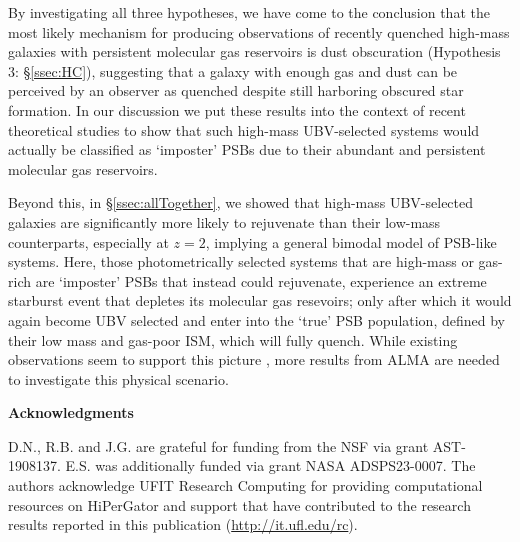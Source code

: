 \documentclass[twocolumn, linenumbers]{aastex631}
\begin{document}
\begin{itemize}[nosep]
\end{itemize}
\vspace*{.05in}

By investigating all three hypotheses, we have come to the conclusion that the most likely mechanism for producing observations of recently quenched high-mass galaxies with persistent molecular gas reservoirs is dust obscuration (Hypothesis 3: \S\ref{ssec:HC}), suggesting that a galaxy with enough gas and dust can be perceived by an observer as quenched despite still harboring obscured star formation.  In our discussion we put these results into the context of recent theoretical studies to show that such high-mass UBV-selected systems would actually be classified as `imposter' PSBs due to their abundant and persistent molecular gas reservoirs.  

Beyond this, in \S\ref{ssec:allTogether}, we showed that high-mass UBV-selected galaxies are significantly more likely to rejuvenate than their low-mass counterparts, especially at $z=2$, implying a general bimodal model of PSB-like systems.  Here, those photometrically selected systems that are high-mass or gas-rich are `imposter' PSBs that instead could rejuvenate, experience an extreme starburst event that depletes its molecular gas resevoirs; only after which it would again become UBV selected and enter into the `true' PSB population, defined by their low mass and gas-poor ISM, which will fully quench.  While existing observations seem to support this picture \cite{setton2025}, more results from ALMA are needed to investigate this physical scenario.
\begin{acknowledgments}
\textbf{Acknowledgments}

\noindent
D.N., R.B. and J.G. are grateful for funding from the NSF via grant AST-1908137.  E.S. was additionally funded via grant NASA ADSPS23-0007.  The authors acknowledge UFIT Research Computing for providing computational resources on HiPerGator and support that have contributed to the research results reported in this publication (\url{http://it.ufl.edu/rc}).
\end{acknowledgments}


%


\appendix
\end{document}
